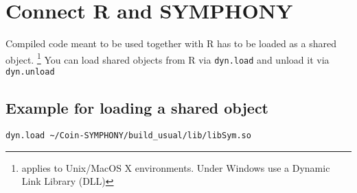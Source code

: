 
\chapter{Connect R and SYMPHONY}
\label{sec:ConnectRAndSYMPHONY}

Compiled code meant to be used together with R has to be loaded as a shared object. \footnote{applies to Unix/MacOS X environments. Under Windows use a Dynamic Link Library (DLL)}
You can load shared objects from R via \verb|dyn.load| and unload it via \verb|dyn.unload|

\section{Example for loading a shared object}
\label{sec:ExampleForLoadingASharedObject}

\begin{verbatim}
dyn.load ~/Coin-SYMPHONY/build_usual/lib/libSym.so

\end{verbatim}
